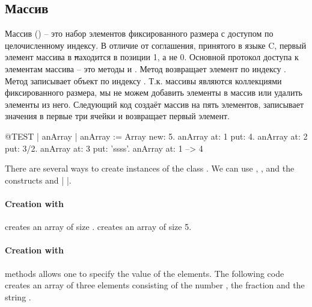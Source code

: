\documentclass[a4paper,10pt,twoside]{book}
\begin{document}
\subsection{Массив}
Массив () -- это набор элементов фиксированного размера с доступом по целочисленному индексу.
В отличие от соглашения, принятого в языке C, первый элемент массива в \st находится в позиции 1, а не 0.
Основной протокол доступа к элементам массива -- это методы  и . Метод  возвращает элемент по индексу . Метод  записывает объект  по индексу . Т.к. массивы являются коллекциями фиксированного размера, мы не можем добавить элементы в массив или удалить элементы из него. Следующий код создаёт массив на пять элементов, записывает значения в первые три ячейки и возвращает первый элемент.

\begin{code}{@TEST | anArray | }
anArray := Array new: 5.
anArray at: 1 put: 4.
anArray at: 2 put: 3/2.
anArray at: 3 put: 'ssss'.
anArray at: 1 --> 4
\end{code}

There are several ways to create instances of the class . We can use , , and  the constructs \ct{#( )} and \ct|{ }|.

\paragraph{Creation with }  creates an array of size .
 creates an array of size 5.

\paragraph{Creation with }  methods allows one to specify the value of the elements.  
The following code creates an array of three elements consisting of the number , the fraction  and the string .
\end{document}
